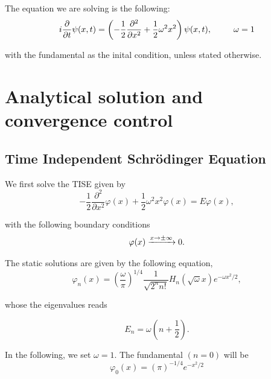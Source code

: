 

\noindent The equation we are solving is the following:
\begin{equation}
 i\frac{\partial}{\partial t}\psi(x,t) = 
	\left(-\frac{1}{2}\frac{\partial^2}{\partial x^2} 
           + \frac{1}{2}\omega^2x^2\right)\psi(x,t),
	  \hspace{9mm} \omega=1 \label{eqn:tdse}
\end{equation}

\noindent with the fundamental as the inital condition, 
unless stated otherwise.

\section{Analytical solution and convergence control}
\subsection{Time Independent Schr\"odinger Equation}

\noindent We first solve the TISE given by 
\begin{equation}
	-\frac{1}{2}\frac{\partial^2}{\partial x^2}\varphi(x) 
	  + \frac{1}{2}\omega^2x^2\varphi(x) = E\varphi(x), \label{eqn:tise}
\end{equation}

\noindent with the following boundary conditions
\begin{equation}
		\varphi(x) \xrightarrow{\tiny x \rightarrow \pm\infty} 0.
\end{equation}

\noindent The static solutions are given by the following equation,
\begin{equation}
 \varphi_n(x) = 
	\left(\frac{\omega}{\pi}\right)^{1/4}
	 \frac{1}{\sqrt{2^n n!}}H_n(\sqrt{\omega}x)e^{-\omega x^2/2}, 
	 \label{eqn:eigenfun}
\end{equation}

\noindent whose the eigenvalues reads 

\begin{equation}
	E_n = \omega\left(n + \frac{1}{2} \right). \label{eqn:eigenval}
\end{equation}

\noindent In the following, we set $\omega=1$. The fundamental $(n=0)$ will be
\begin{equation}
	\varphi_0(x) = \left(\pi\right)^{-1/4} e^{-x^2/2} \label{eqn:init}
\end{equation}


